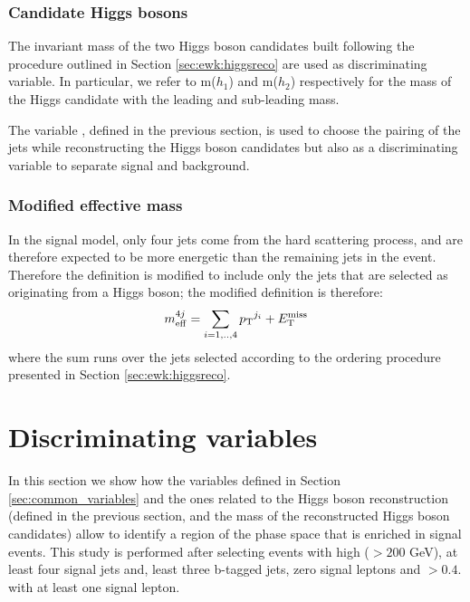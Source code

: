 \subsubsection*{Candidate Higgs bosons}

The invariant mass of the two Higgs boson candidates built following the procedure outlined in Section \ref{sec:ewk:higgsreco} 
are used as discriminating variable. In particular, we refer to m($h_1$) and m($h_2$) respectively for the mass of the Higgs candidate with 
the leading and sub-leading mass.

The variable \dRmax, defined in the previous section, is used to choose the pairing of the jets while reconstructing 
the Higgs boson candidates but also as a discriminating variable to separate signal and background. 

\subsubsection*{Modified effective mass}

In the signal model, only four jets come from the hard scattering process, and are therefore expected to be more energetic than the 
remaining jets in the event. Therefore the \meff definition is modified to include only the jets that are selected 
as originating from a Higgs boson; the modified definition is therefore:
\begin{equation}
m_{\mathrm{eff}}^{4j} = \sum_{i=1,..,4} {p_{\rm T}}^{j_i} + E_{\rm T}^{\mathrm{miss}}
\end{equation}
\noindent where the sum runs over the jets selected according to the ordering procedure presented in Section \ref{sec:ewk:higgsreco}. 


\section{Discriminating variables}

In this section we show how the variables defined in Section \ref{sec:common_variables} and the ones related
to the Higgs boson reconstruction (\dRmax defined in the previous section, and the mass of the reconstructed Higgs boson candidates)
allow to identify a region of the phase space that is enriched in signal events. 
This study is performed after selecting events with high \met ($> 200$ GeV), at least four signal jets and, least three b-tagged jets, zero signal leptons and \dphimin $>0.4$.
with at least one signal lepton.

